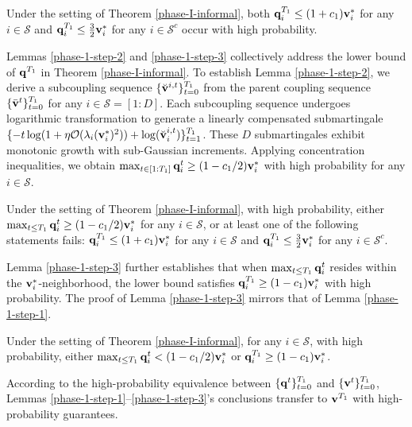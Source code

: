 \begin{lemma}\label{phase-1-step-1}
    Under the setting of Theorem \ref{phase-I-informal}, both $\mathbf{q}_i^{T_1}\leq (1+c_1)\mathbf{v}_i^*$ for any $i\in\mathcal{S}$ and $\mathbf{q}_i^{T_1}\leq\frac{3}{2}\mathbf{v}_i^*$ for any $i\in\mathcal{S}^c$ occur with high probability.
\end{lemma}
Lemmas \ref{phase-1-step-2} and \ref{phase-1-step-3} collectively address the lower bound of $\mathbf{q}^{T_1}$ in Theorem \ref{phase-I-informal}. To establish Lemma \ref{phase-1-step-2}, we derive a subcoupling sequence $\{\Breve{\upv}^{i,t}\}_{t=0}^{T_1}$ from the parent coupling sequence $\{\Bar{\mathbf{v}}^t\}_{t=0}^{T_1}$ for any $i\in\mathcal{S}=[1:D]$. Each subcoupling sequence undergoes logarithmic transformation to generate a linearly compensated submartingale $\{-t\log(1+\eta\mathcal{O}(\lambda_i(\mathbf{v}_i^*)^2))+\log(\breve{\mathbf{v}}_i^{i,t})\}_{t=1}^{T_1}$. These $D$ submartingales exhibit monotonic growth with sub-Gaussian increments. Applying concentration inequalities, we obtain $\max_{t\in[1:T_1]}\mathbf{q}_i^t\geq(1-c_1/2)\mathbf{v}_i^*$ with high probability for any $i\in\mathcal{S}$.
\begin{lemma}\label{phase-1-step-2}
    Under the setting of Theorem \ref{phase-I-informal}, with high probability, either $\max_{t\leq T_1}\mathbf{q}_i^t\geq (1-c_1/2)\mathbf{v}_i^*$ for any $i\in\mathcal{S}$, or at least one of the following statements fails: $\mathbf{q}_i^{T_1}\leq (1+c_1)\mathbf{v}_i^*$ for any $i\in\mathcal{S}$ and $\mathbf{q}_i^{T_1}\leq\frac{3}{2}\mathbf{v}_i^*$ for any $i\in\mathcal{S}^c$.
\end{lemma}
Lemma \ref{phase-1-step-3} further establishes that when $\max_{t\leq T_1}\mathbf{q}_i^t$ resides within the $\mathbf{v}_i^*$-neighborhood, the lower bound satisfies $\mathbf{q}_i^{T_1} \geq (1 - c_1)\mathbf{v}_i^*$ with high probability. The proof of Lemma \ref{phase-1-step-3} mirrors that of Lemma \ref{phase-1-step-1}.
\begin{lemma}\label{phase-1-step-3}
Under the setting of Theorem \ref{phase-I-informal}, for any $i\in\mathcal{S}$, with high probability, either $\max_{t\leq T_1}\mathbf{q}_i^t< (1-c_1/2)\mathbf{v}_i^*$ or $\mathbf{q}_i^{T_1}\geq(1-c_1)\mathbf{v}_i^*$.  
\end{lemma}
According to the high-probability equivalence between $\{\mathbf{q}^t\}_{t=0}^{T_1}$ and $\{\mathbf{v}^t\}_{t=0}^{T_1}$, Lemmas \ref{phase-1-step-1}--\ref{phase-1-step-3}'s conclusions transfer to $\mathbf{v}^{T_1}$ with high-probability guarantees. %
